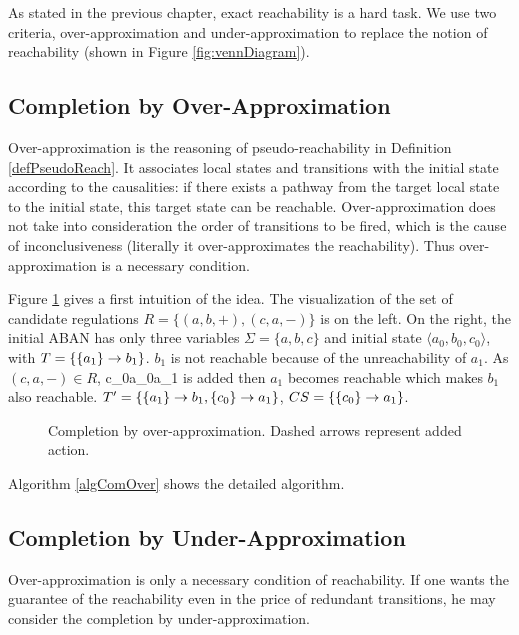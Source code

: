 As stated in the previous chapter, exact reachability is a hard task.
We use two criteria, over-approximation and under-approximation to replace the notion of reachability (shown in Figure \ref{fig:vennDiagram}).


\subsection{Completion by Over-Approximation}
Over-approximation is the reasoning of pseudo-reachability in Definition \ref{defPseudoReach}. 
It associates local states and transitions with the initial state according to the causalities: if there exists a pathway from the target local state to the initial state, this target state can be reachable.
Over-approximation does not take into consideration the order of transitions to be fired, which is the cause of inconclusiveness (literally it over-approximates the reachability).
Thus over-approximation is a necessary condition.

Figure \ref{CompOv} gives a first intuition of the idea.
The visualization of the set of candidate regulations $R=\{(a,b,+),(c,a,-)\}$ is on the left.
On the right, the initial ABAN has only three variables $\Sigma=\{a,b,c\}$ and initial state $\langle a_0,b_0,c_0\rangle$, with $T=\{\acm{a_1}{b_0}{b_1}\}$.
$b_1$ is not reachable because of the unreachability of $a_1$.
As $(c,a,-)\in R$, \ac{c_0}{a_0}{a_1} is added then $a_1$ becomes reachable which makes $b_1$ also reachable.
$T'=\{\acm{a_1}{b_0}{b_1},\acm{c_0}{a_0}{a_1}\}$, $CS=\{\acm{c_0}{a_0}{a_1}\}$.

\begin{figure}[ht]
\centering

\caption[Completion by over-approximation]{Completion by over-approximation. Dashed arrows represent added action.}\label{CompOv}
\end{figure}
Algorithm \ref{algComOver} shows the detailed algorithm.

\subsection{Completion by Under-Approximation}
Over-approximation is only a necessary condition of reachability.
If one wants the guarantee of the reachability even in the price of redundant transitions, he may consider the completion by under-approximation.

